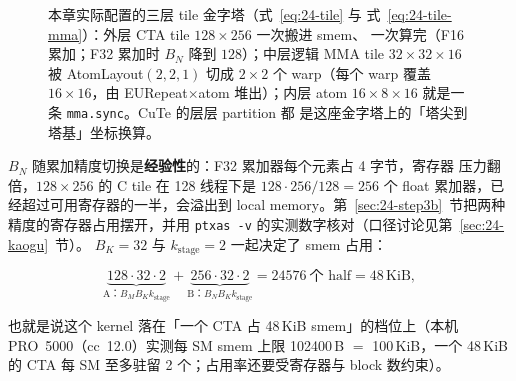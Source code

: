 \begin{figure}[H]
\caption{本章实际配置的三层 tile 金字塔（式~\eqref{eq:24-tile} 与
式~\eqref{eq:24-tile-mma}）：外层 CTA tile $128\times256$ 一次搬进 smem、
一次算完（F16 累加；F32 累加时 $B_N$ 降到 $128$）；中层逻辑 MMA tile
$32\times32\times16$ 被 AtomLayout$(2,2,1)$ 切成 $2\times2$ 个 warp（每个
warp 覆盖 $16\times16$，由 EURepeat$\times$atom 堆出）；内层 atom
$16\times8\times16$ 就是一条 \texttt{mma.sync}。CuTe 的层层 partition 都
是这座金字塔上的「塔尖到塔基」坐标换算。}
\label{fig:24-tile-pyramid}
\end{figure}

$B_N$ 随累加精度切换是\textbf{经验性}的：F32 累加器每个元素占 4 字节，寄存器
压力翻倍，$128\times256$ 的 C tile 在 128 线程下是
$128\cdot256/128=256$ 个 float 累加器，已经超过可用寄存器的一半，会溢出到
local memory。第~\ref{sec:24-step3b}~节把两种精度的寄存器占用摆开，并用
\texttt{ptxas -v} 的实测数字核对（口径讨论见第~\ref{sec:24-kaogu}~节）。
$B_K=32$ 与 $k_{\mathrm{stage}}=2$ 一起决定了 smem 占用：

\begin{equation}
  \underbrace{128\cdot32\cdot2}_{\text{A：}\allowbreak{}B_M B_K k_{\mathrm{stage}}}
  +\underbrace{256\cdot32\cdot2}_{\text{B：}\allowbreak{}B_N B_K k_{\mathrm{stage}}}
  = 24576\ \text{个 half} = 48\,\text{KiB},
  \label{eq:24-smem}
\end{equation}

也就是说这个 kernel 落在「一个 CTA 占 48\,KiB smem」的档位上（本机
PRO~5000（cc~12.0）实测每 SM smem 上限 102400\,B $=$ 100\,KiB，一个
48\,KiB 的 CTA 每 SM 至多驻留 2 个；占用率还要受寄存器与 block 数约束）。

